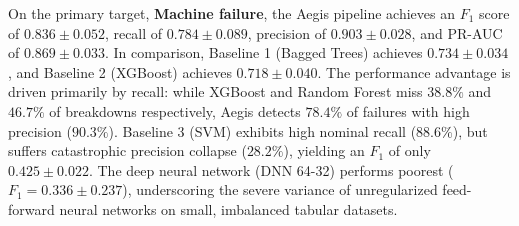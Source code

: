 \documentclass[conference]{IEEEtran}
\begin{document}
On the primary target, \textbf{Machine failure}, the Aegis pipeline achieves an $F_1$ score of $0.836 \pm 0.052$, recall of $0.784 \pm 0.089$, precision of $0.903 \pm 0.028$, and PR-AUC of $0.869 \pm 0.033$. In comparison, Baseline 1 (Bagged Trees) achieves $0.734 \pm 0.034$, and Baseline 2 (XGBoost) achieves $0.718 \pm 0.040$. The performance advantage is driven primarily by recall: while XGBoost and Random Forest miss $38.8\%$ and $46.7\%$ of breakdowns respectively, Aegis detects $78.4\%$ of failures with high precision ($90.3\%$). Baseline 3 (SVM) exhibits high nominal recall ($88.6\%$), but suffers catastrophic precision collapse ($28.2\%$), yielding an $F_1$ of only $0.425 \pm 0.022$. The deep neural network (DNN 64-32) performs poorest ($F_1 = 0.336 \pm 0.237$), underscoring the severe variance of unregularized feed-forward neural networks on small, imbalanced tabular datasets.
\end{document}
